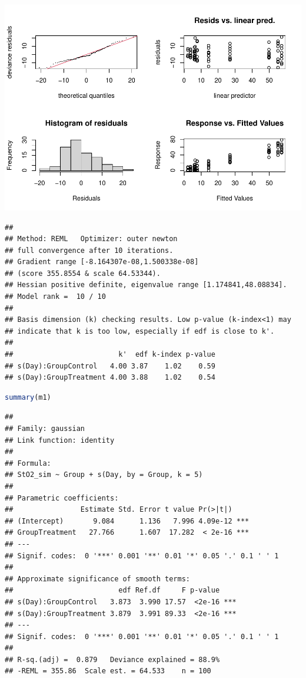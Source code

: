 \documentclass[
]{article}
\begin{document}
\includegraphics{00-Full_document_files/figure-latex/final-model-Appendix-1}

\begin{lstlisting}
## 
## Method: REML   Optimizer: outer newton
## full convergence after 10 iterations.
## Gradient range [-8.164307e-08,1.500338e-08]
## (score 355.8554 & scale 64.53344).
## Hessian positive definite, eigenvalue range [1.174841,48.08834].
## Model rank =  10 / 10 
## 
## Basis dimension (k) checking results. Low p-value (k-index<1) may
## indicate that k is too low, especially if edf is close to k'.
## 
##                         k'  edf k-index p-value
## s(Day):GroupControl   4.00 3.87    1.02    0.59
## s(Day):GroupTreatment 4.00 3.88    1.02    0.54
\end{lstlisting}

\begin{lstlisting}[language=R]
summary(m1)
\end{lstlisting}

\begin{lstlisting}
## 
## Family: gaussian 
## Link function: identity 
## 
## Formula:
## StO2_sim ~ Group + s(Day, by = Group, k = 5)
## 
## Parametric coefficients:
##                Estimate Std. Error t value Pr(>|t|)    
## (Intercept)       9.084      1.136   7.996 4.09e-12 ***
## GroupTreatment   27.766      1.607  17.282  < 2e-16 ***
## ---
## Signif. codes:  0 '***' 0.001 '**' 0.01 '*' 0.05 '.' 0.1 ' ' 1
## 
## Approximate significance of smooth terms:
##                         edf Ref.df     F p-value    
## s(Day):GroupControl   3.873  3.990 17.57  <2e-16 ***
## s(Day):GroupTreatment 3.879  3.991 89.33  <2e-16 ***
## ---
## Signif. codes:  0 '***' 0.001 '**' 0.01 '*' 0.05 '.' 0.1 ' ' 1
## 
## R-sq.(adj) =  0.879   Deviance explained = 88.9%
## -REML = 355.86  Scale est. = 64.533    n = 100
\end{lstlisting}
\end{document}
